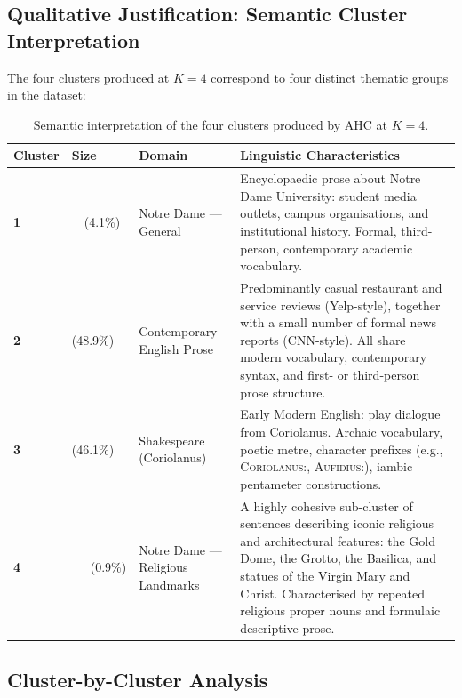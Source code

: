 \documentclass[11pt, a4paper]{article}
\begin{document}
\subsection{Qualitative Justification: Semantic Cluster Interpretation}

The four clusters produced at $K=4$ correspond to four distinct thematic
groups in the dataset:

\begin{table}[h!]
\centering
\renewcommand{\arraystretch}{1.5}
\begin{tabularx}{\textwidth}{>{\centering\bfseries}p{1.5cm}
                              >{\centering}p{2.4cm}
                              >{\centering}p{3.2cm}
                              X}
  \toprule
  \textbf{Cluster} & \textbf{Size} & \textbf{Domain} &
  \textbf{Linguistic Characteristics} \\
  \midrule
  1 & 73\ \ (4.1\%)  & Notre Dame --- General &
    Encyclopaedic prose about Notre Dame University: student media outlets,
    campus organisations, and institutional history.  Formal, third-person,
    contemporary academic vocabulary. \\[4pt]
  2 & 861 (48.9\%) & Contemporary English Prose &
    Predominantly casual restaurant and service reviews (Yelp-style), together
    with a small number of formal news reports (CNN-style).  All share modern
    vocabulary, contemporary syntax, and first- or third-person prose
    structure. \\[4pt]
  3 & 811 (46.1\%) & Shakespeare (Coriolanus) &
    Early Modern English: play dialogue from Coriolanus.  Archaic vocabulary,
    poetic metre, character prefixes (e.g., \textsc{Coriolanus:},
    \textsc{Aufidius:}), iambic pentameter constructions. \\[4pt]
  4 & 15\ \ \ (0.9\%) & Notre Dame --- Religious Landmarks &
    A highly cohesive sub-cluster of sentences describing iconic religious and
    architectural features: the Gold Dome, the Grotto, the Basilica, and
    statues of the Virgin Mary and Christ.  Characterised by repeated
    religious proper nouns and formulaic descriptive prose. \\
  \bottomrule
\end{tabularx}
\caption{Semantic interpretation of the four clusters produced by AHC at
         $K=4$.}
\end{table}

\subsection{Cluster-by-Cluster Analysis}
\end{document}
